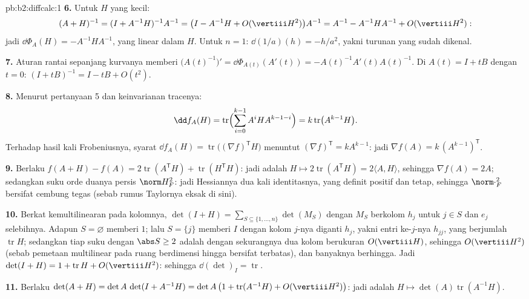 \begin{solution}{pb:b2:diffcalc:1}
\textbf{6.} Untuk $H$ yang kecil:
\[
(A+H)^{-1} = (I + A^{-1}H)^{-1}A^{-1}
= \bigl(I - A^{-1}H + O(\vertiii H^2)\bigr)A^{-1}
= A^{-1} - A^{-1}HA^{-1} + O(\vertiii H^2) :
\]
jadi $\dd\Phi_A(H) = -A^{-1}HA^{-1}$, yang linear dalam $H$. Untuk $n = 1$:
$\dd(1/a)(h) = -h/a^2$, yakni turunan yang sudah dikenal.

\textbf{7.} Aturan rantai sepanjang kurvanya memberi
$\bigl(A(t)^{-1}\bigr)' = \dd\Phi_{A(t)}(A'(t)) =
-A(t)^{-1}A'(t)A(t)^{-1}$. Di $A(t) = I + tB$ dengan $t = 0$: $(I +
tB)^{-1} = I - tB + O(t^2)$.

\textbf{8.} Menurut pertanyaan 5 dan keinvarianan  tracenya:
\[
\dd f_A(H) = \operatorname{tr}\Bigl(\sum_{i=0}^{k-1}
A^iHA^{k-1-i}\Bigr) = k\operatorname{tr}\bigl(A^{k-1}H\bigr) .
\]
Terhadap hasil kali Frobeniusnya, syarat $\dd f_A(H) =
\operatorname{tr}\bigl((\nabla f)^{\mathsf T}H\bigr)$ menuntut
$(\nabla f)^{\mathsf T} = kA^{k-1}$: jadi $\nabla f(A) =
k\,(A^{k-1})^{\mathsf T}$.

\textbf{9.} Berlaku $f(A + H) - f(A) = 2\operatorname{tr}
(A^{\mathsf T}H) + \operatorname{tr}(H^{\mathsf T}H)$: jadi
 adalah $H \mapsto 2\operatorname{tr}(A^{\mathsf T}H) =
2\langle A, H\rangle$, sehingga $\nabla f(A) = 2A$; sedangkan suku
orde duanya persis $\norm H_F^2$: jadi Hessiannya dua kali
 identitasnya, yang definit positif dan tetap, sehingga
$\norm\cdot_F^2$ bersifat cembung tegas (sebab rumus Taylornya
eksak di sini).

\textbf{10.} Berkat kemultilinearan pada kolomnya, $\det(I + H) =
\sum_{S\subseteq\{1,\dots,n\}}\det(M_S)$ dengan $M_S$ berkolom
$h_j$ untuk $j \in S$ dan $e_j$ selebihnya. Adapun $S = \varnothing$
memberi $1$; lalu $S = \{j\}$ memberi  $I$ dengan kolom
$j$-nya diganti $h_j$, yakni entri ke-$j$-nya $h_{jj}$,
yang berjumlah $\operatorname{tr}H$; sedangkan tiap suku dengan $\abs S \geq 2$
adalah  dengan sekurangnya dua kolom berukuran
$O(\vertiii H)$, sehingga $O(\vertiii H^2)$ (sebab pemetaan multilinear pada ruang
berdimensi hingga bersifat terbatas), dan banyaknya berhingga.
Jadi $\det(I + H) = 1 + \operatorname{tr}H +
O(\vertiii H^2)$: sehingga $\dd(\det)_I = \operatorname{tr}$.

\textbf{11.} Berlaku $\det(A + H) = \det A\,\det(I + A^{-1}H) =
\det A\,\bigl(1 + \operatorname{tr}(A^{-1}H) +
O(\vertiii H^2)\bigr)$: jadi  adalah $H \mapsto
\det(A)\operatorname{tr}(A^{-1}H)$.


\end{solution}
